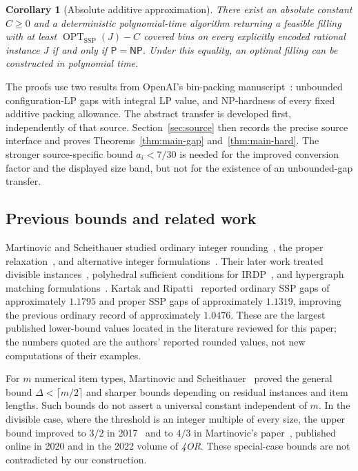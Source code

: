 \documentclass[11pt,a4paper]{article}
\newtheorem{corollary}[theorem]{Corollary}
\theoremstyle{definition}
\theoremstyle{remark}
\newcommand{\SSP}{\mathrm{SSP}}
\newcommand{\OPT}{\operatorname{OPT}}
\newcommand{\Pclass}{\mathsf P}
\newcommand{\NPclass}{\mathsf{NP}}
\begin{document}
\begin{corollary}[Absolute additive approximation]\label{cor:main-complexity}
There exist an absolute constant $C\ge0$ and a deterministic polynomial-time algorithm returning a feasible filling with at least $\OPT_{\SSP}(J)-C$ covered bins on every explicitly encoded rational instance $J$ if and only if $\Pclass=\NPclass$. Under this equality, an optimal filling can be constructed in polynomial time.
\end{corollary}

The proofs use two results from OpenAI's bin-packing manuscript~\cite{OAI26}: unbounded configuration-LP gaps with integral LP value, and NP-hardness of every fixed additive packing allowance. The abstract transfer is developed first, independently of that source. Section~\ref{sec:source} then records the precise source interface and proves Theorems~\ref{thm:main-gap} and~\ref{thm:main-hard}. The stronger source-specific bound $a_i<7/30$ is needed for the improved conversion factor and the displayed size band, but not for the existence of an unbounded-gap transfer.

\subsection{Previous bounds and related work}\label{sec:history}
Martinovic and Scheithauer studied ordinary integer rounding~\cite{MS16a}, the proper relaxation~\cite{MS16b}, and alternative integer formulations~\cite{MS16c}. Their later work treated divisible instances~\cite{MS17,MS18a}, polyhedral sufficient conditions for IRDP~\cite{MS18b}, and hypergraph matching formulations~\cite{MS18c}. Kartak and Ripatti~\cite{KR19} reported ordinary SSP gaps of approximately $1.1795$ and proper SSP gaps of approximately $1.1319$, improving the previous ordinary record of approximately $1.0476$. These are the largest published lower-bound values located in the literature reviewed for this paper; the numbers quoted are the authors' reported rounded values, not new computations of their examples.

For $m$ numerical item types, Martinovic and Scheithauer~\cite{MS19} proved the general bound $\Delta<\lceil m/2\rceil$ and sharper bounds depending on residual instances and item lengths. Such bounds do not assert a universal constant independent of $m$. In the divisible case, where the threshold is an integer multiple of every size, the upper bound improved to $3/2$ in 2017~\cite{MS17} and to $4/3$ in Martinovic's paper~\cite{M22}, published online in 2020 and in the 2022 volume of \emph{4OR}. These special-case bounds are not contradicted by our construction.
\end{document}
